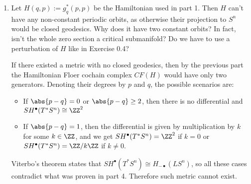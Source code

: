 \begin{enumerate}
    \item Let $H(q,p):=g^*_q(p,p)$ be the Hamiltonian used in part 1. Then $H$ can't have any non-constant periodic orbits, as otherwise their projection to $S^n$ would be  closed geodesics. {\color{red} Why does it have two constant orbits? In fact, isn't the whole zero section a critical submanifold? Do we have to use a perturbation of $H$ like in Exercise 0.4?} 
    
    If there existed a metric with no closed geodesics, then by the previous part the Hamiltonian Floer cochain complex $CF(H)$ would have only two generators. Denoting their degrees by $p$ and $q$, the possible scenarios are:
    \begin{itemize}
        \item If $\abs{p-q}=0$ or $\abs{p-q}\geq 2$, then there is no differential and $SH^\bullet(T^*S^n)\cong\ZZ^2$
        \item If $\abs{p-q}=1$, then the differential is given by multiplication by $k$ for some $k\in \ZZ$, and we get $SH^\bullet(T^*S^n)=\ZZ^2$ if $k=0$ or $SH^\bullet(T^*S^n)=\ZZ/k\ZZ$ if $k\neq0$.
    \end{itemize} 
    Viterbo's theorem states that $SH^\bullet(T^*S^n)\cong H_{-\bullet}(LS^n)$, so all these cases contradict what was proven in part 4. Therefore such metric cannot exist.
\end{enumerate}
 